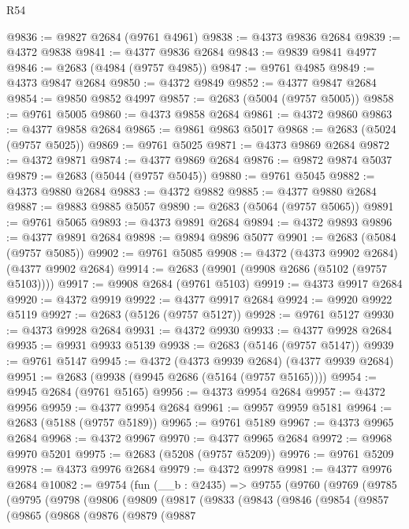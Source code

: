 \begin{lexlean}{R54}
\begin{coremodule}
@9836 := @9827 @2684 (@9761 @4961)
@9838 := @4373 @9836 @2684
@9839 := @4372 @9838
@9841 := @4377 @9836 @2684
@9843 := @9839 @9841 @4977
@9846 := @2683 (@4984 (@9757 @4985))
@9847 := @9761 @4985
@9849 := @4373 @9847 @2684
@9850 := @4372 @9849
@9852 := @4377 @9847 @2684
@9854 := @9850 @9852 @4997
@9857 := @2683 (@5004 (@9757 @5005))
@9858 := @9761 @5005
@9860 := @4373 @9858 @2684
@9861 := @4372 @9860
@9863 := @4377 @9858 @2684
@9865 := @9861 @9863 @5017
@9868 := @2683 (@5024 (@9757 @5025))
@9869 := @9761 @5025
@9871 := @4373 @9869 @2684
@9872 := @4372 @9871
@9874 := @4377 @9869 @2684
@9876 := @9872 @9874 @5037
@9879 := @2683 (@5044 (@9757 @5045))
@9880 := @9761 @5045
@9882 := @4373 @9880 @2684
@9883 := @4372 @9882
@9885 := @4377 @9880 @2684
@9887 := @9883 @9885 @5057
@9890 := @2683 (@5064 (@9757 @5065))
@9891 := @9761 @5065
@9893 := @4373 @9891 @2684
@9894 := @4372 @9893
@9896 := @4377 @9891 @2684
@9898 := @9894 @9896 @5077
@9901 := @2683 (@5084 (@9757 @5085))
@9902 := @9761 @5085
@9908 := @4372 (@4373 @9902 @2684) (@4377 @9902 @2684)
@9914 := @2683 (@9901 (@9908 @2686 (@5102 (@9757 @5103))))
@9917 := @9908 @2684 (@9761 @5103)
@9919 := @4373 @9917 @2684
@9920 := @4372 @9919
@9922 := @4377 @9917 @2684
@9924 := @9920 @9922 @5119
@9927 := @2683 (@5126 (@9757 @5127))
@9928 := @9761 @5127
@9930 := @4373 @9928 @2684
@9931 := @4372 @9930
@9933 := @4377 @9928 @2684
@9935 := @9931 @9933 @5139
@9938 := @2683 (@5146 (@9757 @5147))
@9939 := @9761 @5147
@9945 := @4372 (@4373 @9939 @2684) (@4377 @9939 @2684)
@9951 := @2683 (@9938 (@9945 @2686 (@5164 (@9757 @5165))))
@9954 := @9945 @2684 (@9761 @5165)
@9956 := @4373 @9954 @2684
@9957 := @4372 @9956
@9959 := @4377 @9954 @2684
@9961 := @9957 @9959 @5181
@9964 := @2683 (@5188 (@9757 @5189))
@9965 := @9761 @5189
@9967 := @4373 @9965 @2684
@9968 := @4372 @9967
@9970 := @4377 @9965 @2684
@9972 := @9968 @9970 @5201
@9975 := @2683 (@5208 (@9757 @5209))
@9976 := @9761 @5209
@9978 := @4373 @9976 @2684
@9979 := @4372 @9978
@9981 := @4377 @9976 @2684
@10082 := @9754
    (fun (__b : @2435) =>
    @9755
      (@9760
        (@9769
          (@9785
            (@9795
              (@9798
                (@9806
                  (@9809
                    (@9817
                      (@9833
                        (@9843
                          (@9846
                            (@9854
                              (@9857
                                (@9865
                                  (@9868
                                    (@9876
                                      (@9879
                                        (@9887

\end{coremodule}
\end{lexlean}
